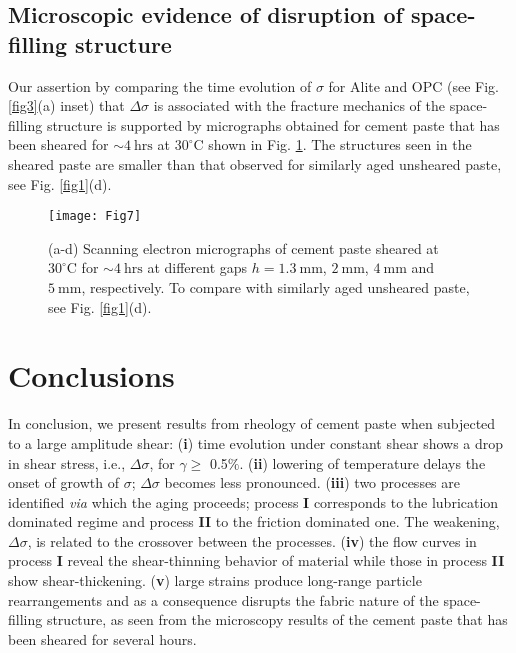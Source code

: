 \documentclass[final,5p,twocolumn]{elsarticle}
\begin{document}
{	

\subsection{Microscopic evidence of disruption of space-filling structure}
Our   assertion  by comparing the time evolution of $\sigma$ for Alite and OPC  (see Fig. \ref{fig3}(a) inset) that $\Delta\sigma$ is associated with the fracture mechanics of the space-filling structure is  supported by micrographs obtained for cement paste that has been sheared for $\sim4~\mbox{hrs}$ at $30^{\circ}\mbox{C}$  shown in  Fig. \ref{fig7}. The structures seen in the sheared paste are smaller than that observed for similarly aged unsheared paste, see Fig. \ref{fig1}(d).  
\begin{figure}[t]
\centering
\texttt{[image: Fig7]}
\caption{(a-d) Scanning electron micrographs of cement paste sheared at $30^{\circ}\mbox{C}$ for $\sim4~\mbox{hrs}$ at different gaps $h=1.3~\mbox{mm}$, $2~\mbox{mm}$, $4~\mbox{mm}$ and $5~\mbox{mm}$, respectively. To compare with similarly aged unsheared paste, see Fig. \ref{fig1}(d). }
\label{fig7}
\end{figure}



\section{Conclusions}
In conclusion, we present results from rheology of cement paste when subjected to a large amplitude shear: 
	(\textbf{i}) time evolution under constant shear shows a drop in shear stress, i.e., $\Delta\sigma$, for $\gamma\ge$ 0.5$\%$. (\textbf{ii}) lowering of temperature  delays the onset of growth of $\sigma$;  $\Delta\sigma$ becomes less pronounced. (\textbf{iii}) two  processes are identified {\it{via}} which the aging proceeds;  process \textbf{I} corresponds to the lubrication dominated regime and  process \textbf{II} to the friction dominated one. The weakening, $\Delta\sigma$, is related to the crossover between the  processes. (\textbf{iv}) the flow curves in  process \textbf{I} reveal the shear-thinning behavior of material while those in process \textbf{II} show shear-thickening. (\textbf{v}) large strains produce long-range particle rearrangements and as a consequence disrupts the fabric nature of the space-filling structure, as seen from the microscopy results of the cement paste that has been sheared for several hours.
	

}
\end{document}
